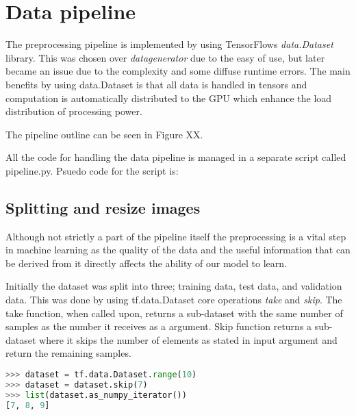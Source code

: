\documentclass[thesis.tex]{subfiles}
\begin{document}
\section{Data pipeline} \label{sec:data_pipeline}
The preprocessing pipeline is implemented by using TensorFlows \textit{data.Dataset} library. This was chosen over \textit{datagenerator} due to the easy of use, but later became an issue due to the complexity and some diffuse runtime errors. The main benefits by using data.Dataset is that all data is handled in tensors and computation is automatically distributed to the GPU which enhance the load distribution of processing power. 

The pipeline outline can be seen in Figure XX.


All the code for handling the data pipeline is managed in a separate script called pipeline.py. Psuedo code for the script is:



\subsection{Splitting and resize images}
Although not strictly a part of the pipeline itself the preprocessing is a vital step in machine learning as the quality of the data and the useful information that can be derived from it directly affects the ability of our model to learn.

Initially the dataset was split into three; training data, test data, and validation data. This was done by using tf.data.Dataset core operations \textit{take} and \textit{skip}. The take function, when called upon, returns a sub-dataset with the same number of samples as the number it receives as a argument. Skip function returns a sub-dataset where it skips the number of elements as stated in input argument and return the remaining samples.

\begin{lstlisting}[language=Python]
>>> dataset = tf.data.Dataset.range(10)
>>> dataset = dataset.skip(7)
>>> list(dataset.as_numpy_iterator())
[7, 8, 9]
\end{lstlisting}
\end{document}

